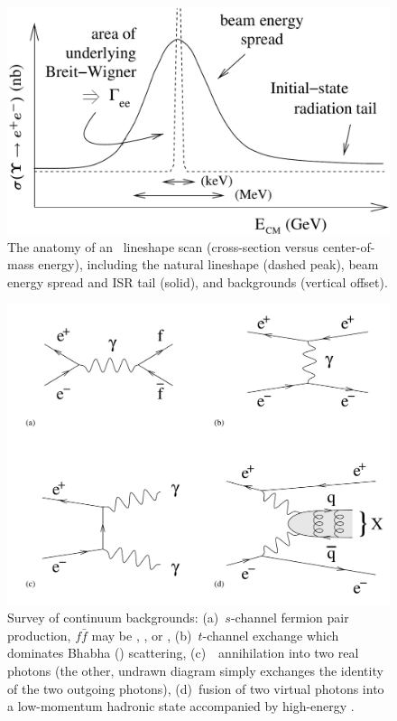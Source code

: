 \documentclass{cornell}
\begin{document}
\begin{figure}[p]
  \begin{center}
    \includegraphics[width=0.7\linewidth]{plots/cartoon}
  \end{center}
  \caption[Anatomy of an \ups\ lineshape scan]{\label{cartoon} The
  anatomy of an \ups\ lineshape scan (cross-section versus
  center-of-mass energy), including the natural lineshape (dashed
  peak), beam energy spread and ISR tail (solid), and backgrounds
  (vertical offset).}
\end{figure}

\begin{figure}[p]
  \begin{center}
    \includegraphics[width=\linewidth]{newplots/continuum}
  \end{center}
  \caption[Survey of continuum backgrounds]{\label{continuum} Survey
  of continuum backgrounds: (a)~$s$-channel fermion pair production,
  $f\bar{f}$ may be \qqbar, \mumu, or \tautau, (b)~$t$-channel
  exchange which dominates Bhabha (\ee) scattering, (c)~\ee\
  annihilation into two real photons (the other, undrawn diagram
  simply exchanges the identity of the two outgoing photons),
  (d)~fusion of two virtual photons into a low-momentum hadronic state
  accompanied by high-energy \ee.}
\end{figure}
\end{document}
